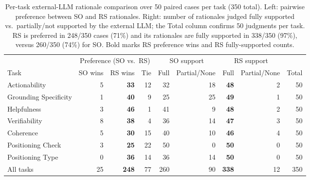 \begin{table}[t]
\centering
\normalsize
\setlength{\tabcolsep}{4pt}
\begin{tabular}{l rrr rr rr r}
\toprule
& \multicolumn{3}{c}{Preference (SO vs.\ RS)}
& \multicolumn{2}{c}{SO support}
& \multicolumn{2}{c}{RS support} & \\
\cmidrule(lr){2-4} \cmidrule(lr){5-6} \cmidrule(lr){7-8}
Task & SO wins & RS wins & Tie
     & Full & Partial/None
     & Full & Partial/None
     & Total \\
\midrule
Actionability           & 5  & \textbf{33}  & 12 & 32 & 18 & \textbf{48} & 2  & 50  \\
Grounding Specificity   & 1  & \textbf{40}  & 9  & 25 & 25 & \textbf{49} & 1  & 50  \\
Helpfulness             & 3  & \textbf{46}  & 1  & 41 & 9  & \textbf{48} & 2  & 50  \\
Verifiability           & 8  & \textbf{38}  & 4  & 36 & 14 & \textbf{47} & 3  & 50  \\
Coherence               & 5  & \textbf{30}  & 15 & 40 & 10 & \textbf{46} & 4  & 50  \\
Positioning Check       & 3  & \textbf{25}  & 22 & 50 & 0  & \textbf{50} & 0  & 50  \\
Positioning Type        & 0  & \textbf{36}  & 14 & 36 & 14 & \textbf{50} & 0  & 50  \\
\midrule
All tasks               & 25 & \textbf{248} & 77 & 260 & 90 & \textbf{338} & 12 & 350 \\
\bottomrule
\end{tabular}
\caption{Per-task external-LLM rationale comparison over 50 paired cases per
task (350 total). Left: pairwise preference between SO and RS rationales.
Right: number of rationales judged fully supported vs.\ partially/not
supported by the external LLM; the Total column confirms 50 judgments per
task. RS is preferred in 248/350 cases (71\%) and its rationales are fully
supported in 338/350 (97\%), versus 260/350 (74\%) for SO. Bold marks RS
preference wins and RS fully-supported counts.}
\label{tab:full-rationale-quality-task}
\end{table}

